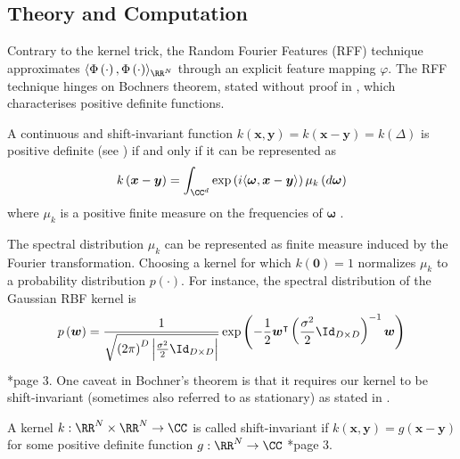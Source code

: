 \subsection{Theory and Computation}\label{Section3.1}
Contrary to the kernel trick, the Random Fourier Features (RFF) technique approximates $\langle \Phi \left( \cdot \right) , \Phi \left( \cdot \right) \rangle_{\RR^N}$ through an explicit feature mapping $\varphi$. The RFF technique hinges on Bochners theorem, stated without proof in , which characterises positive definite functions.

\begin{thm}[Bochner's] \label{theorem: bochner}
    A continuous and shift-invariant function $k \left( \bm{x} , \bm{y} \right) = k \left( \bm{x} - \bm{y} \right) = k \left( \Delta \right)$ is positive definite (see ) if and only if it can be represented as
    \[
        k \left( \bm{x} - \bm{y} \right) = \int_{\CC^d} \exp \left( i \langle \bm{\omega} , \bm{x} - \bm{y} \rangle \right) \mu_k \left( d \bm{\omega} \right)
    \]
    where $\mu_k$ is a positive finite measure on the frequencies of $\bm{\omega}$ \cite{HahnHans1933SBVü,LiuFanghui2021RFfK}.
\end{thm}

The spectral distribution $\mu_k$ can be represented as finite measure induced by the Fourier transformation. Choosing a kernel for which $k (\bm{0}) = 1$ normalizes $\mu_k$ to a probability distribution $p (\cdot)$. For instance, the spectral distribution of the Gaussian RBF kernel is
\begin{equation} \label{eq: rbf-spec-pdf}
    p \left( \bm{w}\right) = \frac{1}{\sqrt{\left( 2 \pi\right)^{D} \left| \frac{\sigma^2}{2} \Id_{D \times D} \right|}} \exp \left( -\frac{1}{2} \bm{w}^\intercal \left( \frac{\sigma^2}{2} \Id_{D \times D} \right)^{-1} \bm{w} \right)
\end{equation}
\cite{NIPS2007_013a006f}*{page 3}. One caveat in Bochner's theorem is that it requires our kernel to be shift-invariant (sometimes also referred to as stationary) as stated in .

\begin{defe} \label{defe: shift-invar}
    A kernel $k : \RR^N \times \RR^N \to \CC$ is called shift-invariant if $k \left( \bm{x}, \bm{y} \right) = g \left( \bm{x} - \bm{y} \right)$ for some positive definite function $g : \RR^N \to \CC$ \cite{JMLR:v17:14-538}*{page 3}.
\end{defe}

